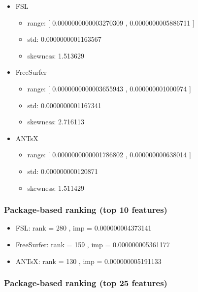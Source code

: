 \documentclass[
  10pt,
]{article}
\begin{document}
\begin{itemize}
\item
  FSL

  \begin{itemize}
  \item
    range: {[} 0.0000000000003270309 , 0.0000000005886711 {]}
  \item
    std: 0.0000000001163567
  \item
    skewness: 1.513629
  \end{itemize}
\item
  FreeSurfer

  \begin{itemize}
  \item
    range: {[} 0.0000000000003655943 , 0.000000001000974 {]}
  \item
    std: 0.0000000001167341
  \item
    skewness: 2.716113
  \end{itemize}
\item
  ANTsX

  \begin{itemize}
  \item
    range: {[} 0.0000000000001786802 , 0.000000000638014 {]}
  \item
    std: 0.000000000120871
  \item
    skewness: 1.511429
  \end{itemize}
\end{itemize}

\hypertarget{package-based-ranking-top-10-features-10}{%
\subsubsection{Package-based ranking (top 10
features)}\label{package-based-ranking-top-10-features-10}}

\begin{itemize}
\item
  FSL: rank = 280 , imp = 0.000000004373141
\item
  FreeSurfer: rank = 159 , imp = 0.000000005361177
\item
  ANTsX: rank = 130 , imp = 0.000000005191133
\end{itemize}

\hypertarget{package-based-ranking-top-25-features-10}{%
\subsubsection{Package-based ranking (top 25
features)}\label{package-based-ranking-top-25-features-10}}
\end{document}
